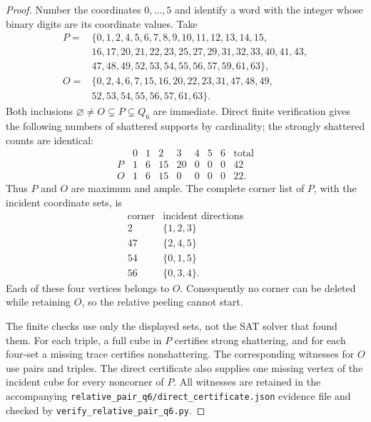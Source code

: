 \documentclass[11pt]{article}
\numberwithin{equation}{section}
\theoremstyle{definition}
\theoremstyle{remark}
\begin{document}
\begin{proof}
Number the coordinates $0,\ldots,5$ and identify a word with the
integer whose binary digits are its coordinate values. Take
\[
\begin{aligned}
P={}&\{0,1,2,4,5,6,7,8,9,10,11,12,13,14,15,\\
 &16,17,20,21,22,23,25,27,29,31,32,33,40,41,43,\\
 &47,48,49,52,53,54,55,56,57,59,61,63\},\\
O={}&\{0,2,4,6,7,15,16,20,22,23,31,47,48,49,\\
 &52,53,54,55,56,57,61,63\}.
\end{aligned}
\]
Both inclusions $\varnothing\ne O\subsetneq P\subsetneq Q_6$ are
immediate. Direct finite verification gives the following numbers of
shattered supports by cardinality; the strongly shattered counts are
identical:
\[
\begin{array}{c|rrrrrrr|r}
 &0&1&2&3&4&5&6&\text{total}\\\hline
 P&1&6&15&20&0&0&0&42\\
 O&1&6&15&0&0&0&0&22.
\end{array}
\]
Thus $P$ and $O$ are maximum and ample. The complete corner list of
$P$, with the incident coordinate sets, is
\[
\begin{array}{c|c}
\text{corner}&\text{incident directions}\\\hline
2&\{1,2,3\}\\
47&\{2,4,5\}\\
54&\{0,1,5\}\\
56&\{0,3,4\}.
\end{array}
\]
Each of these four vertices belongs to $O$. Consequently no corner
can be deleted while retaining $O$, so the relative peeling cannot start.

The finite checks use only the displayed sets, not the SAT solver
that found them. For each triple, a full cube in $P$ certifies strong
shattering, and for each four-set a missing trace certifies nonshattering.
The corresponding witnesses for $O$ use pairs and triples. The direct
certificate also supplies one missing vertex of the incident cube for
every noncorner of $P$. All witnesses are retained in the accompanying
\texttt{relative\_pair\_q6/direct\_certificate.json} evidence file and
checked by \texttt{verify\_relative\_pair\_q6.py}.
\end{proof}
\end{document}

